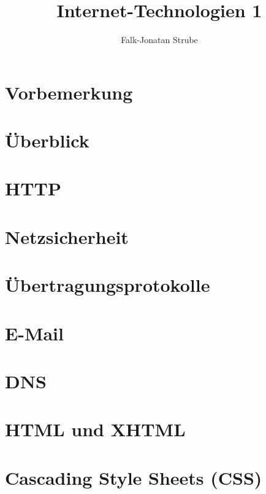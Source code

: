 \documentclass{scrreprt}
\title{Internet-Technologien 1}
\author{Falk-Jonatan Strube}
\begin{document}
\maketitle
\tableofcontents

\chapter*{Vorbemerkung}

\chapter{Überblick}


\chapter{HTTP}


\chapter{Netzsicherheit}


\chapter{Übertragungsprotokolle}


\chapter{E-Mail}


\chapter{DNS}


\chapter{HTML und XHTML}


\chapter{Cascading Style Sheets (CSS)}

\end{document}
